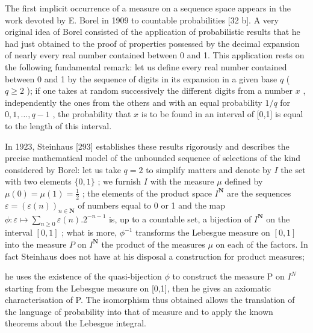 The first implicit occurrence of a measure on a sequence space appears in the work devoted by E. Borel in 1909 to countable probabilities {[}32 b{]}. A very original idea of Borel consisted of the application of probabilistic results that he had just obtained to the proof of properties possessed by the decimal expansion of nearly every real number contained between 0 and 1. This application rests on the following fundamental remark: let us define every real number contained between 0 and 1 by the sequence of digits in its expansion in a given base \(q\) ( \(q \geq 2\) ); if one takes at random successively the different digits from a number \(x\) , independently the ones from the others and with an equal probability \(1/q\) for \(0,1,\ldots,q-1\) , the probability that \(x\) is to be found in an interval of [0,1] is equal to the length of this interval.

In 1923, Steinhaus {[}293{]} establishes these results rigorously and describes the precise mathematical model of the unbounded sequence of selections of the kind considered by Borel: let us take \(q = 2\) to simplify matters and denote by \(I\) the set with two elements \(\{0,1\}\) ; we furnish \(I\) with the measure \(\mu\) defined by \(\mu(0) = \mu(1) = \frac{1}{2}\) ; the elements of the product space \(I^{\mathbf{N}}\) are the sequences \(\varepsilon = (\varepsilon(n))_{n \in \mathbf{N}}\) of numbers equal to 0 or 1 and the map \(\phi : \varepsilon \mapsto \sum_{n \geq 0} \varepsilon(n). 2^{-n-1}\) is, up to a countable set, a bijection of \(I^{\mathbf{N}}\) on the interval \([0,1]\) ; what is more, \(\phi^{-1}\) transforms the Lebesgue measure on \([0,1]\) into the measure \(P\) on \(I^{\mathbf{N}}\) the product of the measures \(\mu\) on each of the factors. In fact Steinhaus does not have at his disposal a construction for product measures;

he uses the existence of the quasi-bijection \(\phi\) to construct the measure P on \(I^{N}\) starting from the Lebesgue measure on [0,1], then he gives an axiomatic characterisation of P. The isomorphism thus obtained allows the translation of the language of probability into that of measure and to apply the known theorems about the Lebesgue integral.

